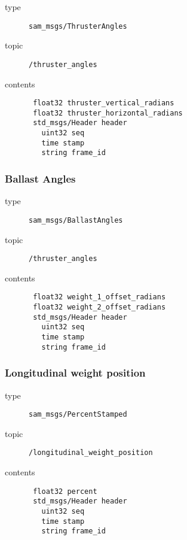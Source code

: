 \documentclass[9pt,technote]{IEEEtran} %
\begin{document}
\begin{description}
\item[type] \texttt{sam\_msgs/ThrusterAngles}
\item[topic] \texttt{/thruster\_angles}
\item[contents] \begin{scriptsize}
\begin{verbatim}
 float32 thruster_vertical_radians
 float32 thruster_horizontal_radians
 std_msgs/Header header
   uint32 seq
   time stamp
   string frame_id
\end{verbatim}
\end{scriptsize}
\end{description}

\subsubsection{Ballast Angles}

\begin{description}
\item[type] \texttt{sam\_msgs/BallastAngles}
\item[topic] \texttt{/thruster\_angles}
\item[contents] \begin{scriptsize}
\begin{verbatim}
 float32 weight_1_offset_radians
 float32 weight_2_offset_radians
 std_msgs/Header header
   uint32 seq
   time stamp
   string frame_id
\end{verbatim}
\end{scriptsize}
\end{description}

\subsubsection{Longitudinal weight position} 

\begin{description}
\item[type] \texttt{sam\_msgs/PercentStamped}
\item[topic] \texttt{/longitudinal\_weight\_position}
\item[contents] \begin{scriptsize}
\begin{verbatim}
 float32 percent
 std_msgs/Header header
   uint32 seq
   time stamp
   string frame_id
\end{verbatim}
\end{scriptsize}
\end{description}
\end{document}
